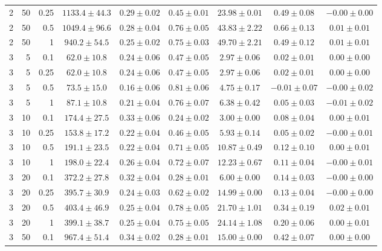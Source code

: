 \begin{table}[htbp]
\begin{tabular}{@{}rrrcccccc@{}}
2 & 50 & 0.25 & $1133.4 \pm 44.3$ & $0.29 \pm 0.02$ & $0.45 \pm 0.01$ & $23.98 \pm 0.01$ & $0.49 \pm 0.08$ & $-0.00 \pm 0.00$ \\
2 & 50 & 0.5 & $1049.4 \pm 96.6$ & $0.28 \pm 0.04$ & $0.76 \pm 0.05$ & $43.83 \pm 2.22$ & $0.66 \pm 0.13$ & $0.01 \pm 0.01$ \\
2 & 50 & 1 & $940.2 \pm 54.5$ & $0.25 \pm 0.02$ & $0.75 \pm 0.03$ & $49.70 \pm 2.21$ & $0.49 \pm 0.12$ & $0.01 \pm 0.01$ \\
\midrule
3 & 5 & 0.1 & $62.0 \pm 10.8$ & $0.24 \pm 0.06$ & $0.47 \pm 0.05$ & $2.97 \pm 0.06$ & $0.02 \pm 0.01$ & $0.00 \pm 0.00$ \\
3 & 5 & 0.25 & $62.0 \pm 10.8$ & $0.24 \pm 0.06$ & $0.47 \pm 0.05$ & $2.97 \pm 0.06$ & $0.02 \pm 0.01$ & $0.00 \pm 0.00$ \\
3 & 5 & 0.5 & $73.5 \pm 15.0$ & $0.16 \pm 0.06$ & $0.81 \pm 0.06$ & $4.75 \pm 0.17$ & $-0.01 \pm 0.07$ & $-0.00 \pm 0.02$ \\
3 & 5 & 1 & $87.1 \pm 10.8$ & $0.21 \pm 0.04$ & $0.76 \pm 0.07$ & $6.38 \pm 0.42$ & $0.05 \pm 0.03$ & $-0.01 \pm 0.02$ \\
3 & 10 & 0.1 & $174.4 \pm 27.5$ & $0.33 \pm 0.06$ & $0.24 \pm 0.02$ & $3.00 \pm 0.00$ & $0.08 \pm 0.04$ & $0.00 \pm 0.01$ \\
3 & 10 & 0.25 & $153.8 \pm 17.2$ & $0.22 \pm 0.04$ & $0.46 \pm 0.05$ & $5.93 \pm 0.14$ & $0.05 \pm 0.02$ & $-0.00 \pm 0.01$ \\
3 & 10 & 0.5 & $191.1 \pm 23.5$ & $0.22 \pm 0.04$ & $0.71 \pm 0.05$ & $10.87 \pm 0.49$ & $0.12 \pm 0.10$ & $0.00 \pm 0.01$ \\
3 & 10 & 1 & $198.0 \pm 22.4$ & $0.26 \pm 0.04$ & $0.72 \pm 0.07$ & $12.23 \pm 0.67$ & $0.11 \pm 0.04$ & $-0.00 \pm 0.01$ \\
3 & 20 & 0.1 & $372.2 \pm 27.8$ & $0.32 \pm 0.04$ & $0.28 \pm 0.01$ & $6.00 \pm 0.00$ & $0.14 \pm 0.03$ & $-0.00 \pm 0.00$ \\
3 & 20 & 0.25 & $395.7 \pm 30.9$ & $0.24 \pm 0.03$ & $0.62 \pm 0.02$ & $14.99 \pm 0.00$ & $0.13 \pm 0.04$ & $-0.00 \pm 0.00$ \\
3 & 20 & 0.5 & $403.4 \pm 46.9$ & $0.25 \pm 0.04$ & $0.78 \pm 0.05$ & $21.70 \pm 1.01$ & $0.34 \pm 0.19$ & $0.02 \pm 0.01$ \\
3 & 20 & 1 & $399.1 \pm 38.7$ & $0.25 \pm 0.04$ & $0.75 \pm 0.05$ & $24.14 \pm 1.08$ & $0.20 \pm 0.06$ & $0.00 \pm 0.01$ \\
3 & 50 & 0.1 & $967.4 \pm 51.4$ & $0.34 \pm 0.02$ & $0.28 \pm 0.01$ & $15.00 \pm 0.00$ & $0.42 \pm 0.07$ & $0.00 \pm 0.00$ \\

\end{tabular}
\end{table}
